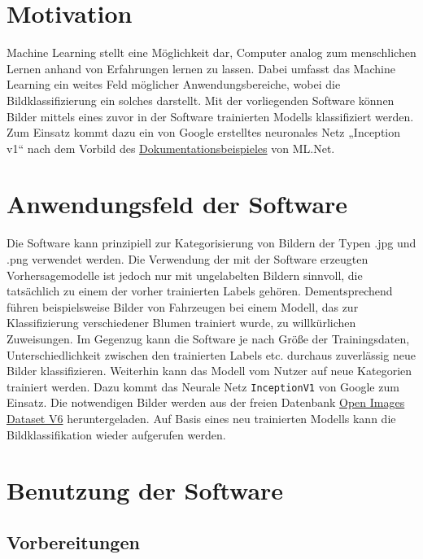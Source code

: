 \documentclass[doktyp=parbeit]{TUBAFarbeiten}
\begin{document}
	
	\maketitle
	
	\tableofcontents
\section{Motivation}
Machine Learning stellt eine Möglichkeit dar, Computer analog zum menschlichen Lernen anhand von Erfahrungen lernen zu lassen. Dabei umfasst das Machine Learning ein weites Feld möglicher Anwendungsbereiche, wobei die Bildklassifizierung ein solches darstellt. Mit der vorliegenden Software können Bilder mittels eines zuvor in der Software trainierten Modells klassifiziert werden. 
Zum Einsatz kommt dazu ein von Google erstelltes neuronales Netz „Inception v1“ nach dem Vorbild des \href{https://docs.microsoft.com/de-de/dotnet/machine-learning/tutorials/image-classification}{Dokumentationsbeispieles} von ML.Net.
\section{Anwendungsfeld der Software}
Die Software kann prinzipiell zur Kategorisierung von Bildern der Typen .jpg und .png verwendet werden. Die Verwendung der mit der Software erzeugten Vorhersagemodelle ist jedoch nur mit ungelabelten Bildern sinnvoll, die tatsächlich zu einem der vorher trainierten Labels gehören. Dementsprechend führen beispielsweise Bilder von Fahrzeugen bei einem Modell, das zur Klassifizierung verschiedener Blumen trainiert wurde, zu willkürlichen Zuweisungen.
Im Gegenzug kann die Software je nach Größe der Trainingsdaten, Unterschiedlichkeit zwischen den trainierten Labels etc. durchaus zuverlässig neue Bilder klassifizieren. 
Weiterhin kann das Modell vom Nutzer auf neue Kategorien trainiert werden. Dazu kommt das Neurale Netz \texttt{InceptionV1} von Google zum Einsatz. Die notwendigen Bilder werden aus der freien Datenbank \href{https://storage.googleapis.com/openimages/web/index.html}{Open Images Dataset V6} heruntergeladen. Auf Basis eines neu trainierten Modells kann die Bildklassifikation wieder aufgerufen werden.
\section{Benutzung der Software}
\subsection{Vorbereitungen}
\end{document}
